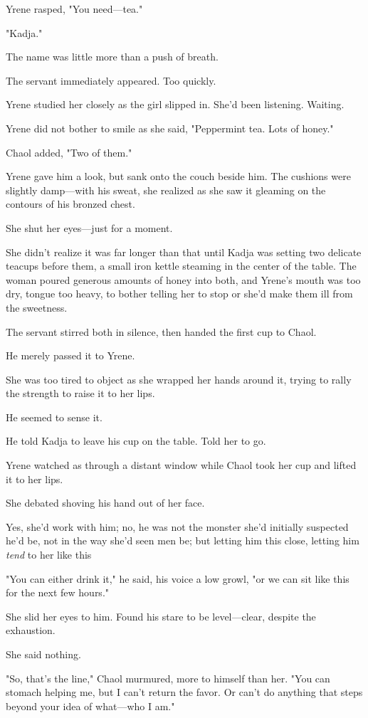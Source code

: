 Yrene rasped, "You need---tea."

"Kadja."

The name was little more than a push of breath.

The servant immediately appeared. Too quickly.

Yrene studied her closely as the girl slipped in. She'd been listening. Waiting.

Yrene did not bother to smile as she said, "Peppermint tea. Lots of honey."

Chaol added, "Two of them."

Yrene gave him a look, but sank onto the couch beside him. The cushions were slightly damp---with his sweat, she realized as she saw it gleaming on the contours of his bronzed chest.

She shut her eyes---just for a moment.

She didn't realize it was far longer than that until Kadja was setting two delicate teacups before them, a small iron kettle steaming in the center of the table. The woman poured generous amounts of honey into both, and Yrene's mouth was too dry, tongue too heavy, to bother telling her to stop or she'd make them ill from the sweetness.

The servant stirred both in silence, then handed the first cup to Chaol.

He merely passed it to Yrene.

She was too tired to object as she wrapped her hands around it, trying to rally the strength to raise it to her lips.

He seemed to sense it.

He told Kadja to leave his cup on the table. Told her to go.

Yrene watched as through a distant window while Chaol took her cup and lifted it to her lips.

She debated shoving his hand out of her face.

Yes, she'd work with him; no, he was not the monster she'd initially suspected he'd be, not in the way she'd seen men be; but letting him this close, letting him \emph{tend} to her like this 

"You can either drink it," he said, his voice a low growl, "or we can sit like this for the next few hours."

She slid her eyes to him. Found his stare to be level---clear, despite the exhaustion.

She said nothing.

"So, that's the line," Chaol murmured, more to himself than her. "You can stomach helping me, but I can't return the favor. Or can't do anything that steps beyond your idea of what---who I am."


